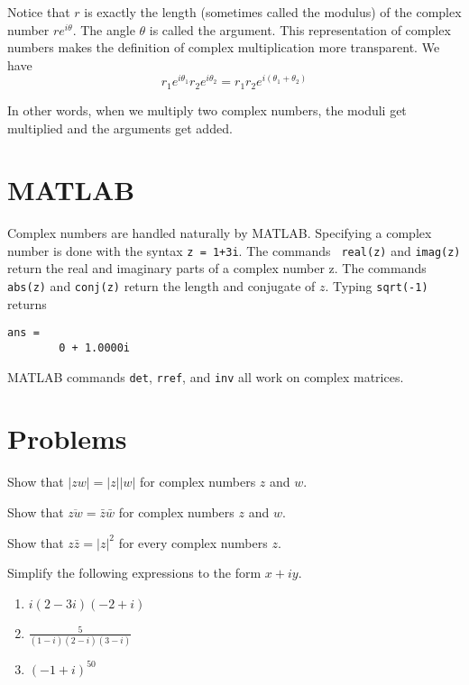 Notice that $r$ is exactly the length (sometimes called the modulus)
of the complex number $re^{i\theta}$.  The angle $\theta$ is called the argument. This
representation of complex numbers makes the definition of complex
multiplication more transparent.  We have
\[
r_1e^{i\theta_1}r_2e^{i\theta_2} = r_1r_2e^{i(\theta_1+\theta_2)}
\]

In other words, when we multiply two complex numbers, the moduli get
multiplied and the arguments get added.

\section{MATLAB}

Complex numbers are handled naturally by MATLAB.  Specifying a complex
number is done with the syntax {\tt z = 1+3i}. The commands {\tt
real(z)} and {\tt imag(z)} return the real and imaginary parts of a
complex number z. The commands {\tt abs(z)} and {\tt conj(z)} return
the length and conjugate of $z$. Typing {\tt sqrt(-1)} returns
\begin{verbatim}
ans =
        0 + 1.0000i
\end{verbatim}
MATLAB commands {\tt det}, {\tt rref}, and {\tt inv} all work on complex matrices. 

\section{Problems}

\begin{problem}
\label{op4_5}
Show that $|zw|=|z||w|$ for complex numbers $z$ and $w$.
\end{problem}

\begin{problem}
\label{op4_6}
Show that $\overline{zw}=\bar z \bar w$ for complex numbers $z$ and $w$.
\end{problem}

\begin{problem}
\label{op4_7}
Show that $z\bar z= |z|^2$ for every complex numbers $z$.
\end{problem}

\begin{problem}
\label{2009_a10_1}
Simplify the following expressions to the form $x + iy$.
\begin{enumerate}
\item $\displaystyle i(2-3i)(-2+i)$
\item $\displaystyle \frac{5}{(1-i)(2-i)(3-i)}$
\item $(-1+i)^{50}$
\end{enumerate}
\end{problem}

